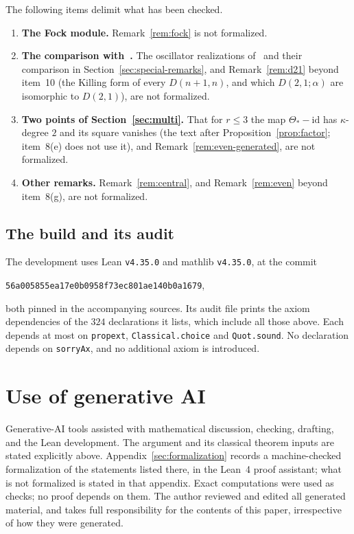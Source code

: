 \documentclass[11pt]{article}
\numberwithin{equation}{section}
\theoremstyle{definition}
\theoremstyle{remark}
\begin{document}
The following items delimit what has been checked.

\begin{enumerate}
\item \textbf{The Fock module.} Remark~\ref{rem:fock} is not formalized.
\item \textbf{The comparison with~\cite{FSS00}.} The oscillator realizations of~\cite{FSS00}
and their comparison in Section~\ref{sec:special-remarks}, and Remark~\ref{rem:d21} beyond
item~10 (the Killing form of every $D(n+1,n)$, and which $D(2,1;\alpha)$ are isomorphic to
$D(2,1)$), are not formalized.
\item \textbf{Two points of Section~\ref{sec:multi}.} That for $r\leq3$ the map
$\Theta_*-\mathrm{id}$ has $\kappa$-degree $2$ and its square vanishes (the text after
Proposition~\ref{prop:factor}; item~8(e) does not use it), and
Remark~\ref{rem:even-generated}, are not formalized.
\item \textbf{Other remarks.} Remark~\ref{rem:central}, and Remark~\ref{rem:even} beyond
item~8(g), are not formalized.
\end{enumerate}

\subsection{The build and its audit}\label{subsec:formal-repro}

The development uses Lean \texttt{v4.35.0} and mathlib \texttt{v4.35.0}, at the commit
\begin{center}\texttt{56a005855ea17e0b0958f73ec801ae140b0a1679},\end{center}
both pinned in the accompanying sources. Its audit file prints the axiom dependencies of
the $324$ declarations it lists, which include all those above. Each depends at most on
\texttt{propext}, \texttt{Classical.choice} and \texttt{Quot.sound}.
No declaration depends on \texttt{sorryAx}, and no additional axiom is
introduced.

\section*{Use of generative AI}
Generative-AI tools assisted with mathematical discussion, checking, drafting, and the Lean development.
The argument and its classical theorem inputs are stated explicitly above.
Appendix~\ref{sec:formalization} records a machine-checked formalization of the
statements listed there, in the Lean~4 proof assistant; what is not formalized is stated
in that appendix. Exact computations were used as checks; no proof depends on them.
The author reviewed and edited all generated material, and takes full responsibility for the
contents of this paper, irrespective of how they were generated.
\end{document}
